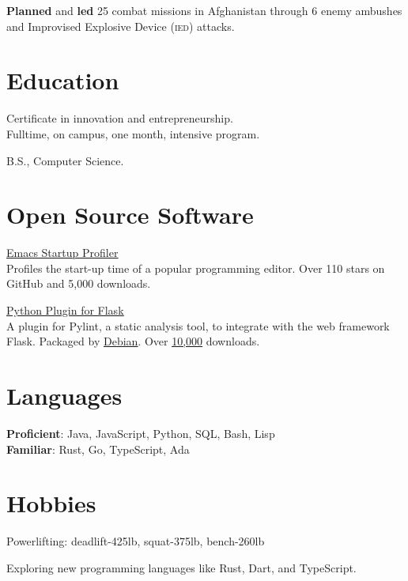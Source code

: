 \documentclass[letterpaper,11pt]{jschaf-resume}
\newcommand*{\action}[1]{\textbf{#1}}
\newcommand*{\abbrevparen}[1]{{\footnotesize (}\textsc{#1}{\footnotesize )}}
\begin{document}
\begin{paracol}{2}
\begin{workitems}
\item \action{Planned} and \action{led} 25 combat missions in Afghanistan
  through 6 enemy ambushes and Improvised Explosive Device \abbrevparen{ied} attacks.
\end{workitems}

\section*{Education}

Certificate in innovation and entrepreneurship.\\
Fulltime, on campus, one month, intensive program.

B.S., Computer Science.

\switchcolumn

\section*{Open Source Software}

\href{https://github.com/jschaf/esup}{\ul{Emacs Startup Profiler}}\\
Profiles the start-up time of a popular programming editor.  Over 110 stars on
GitHub and 5,000 downloads.

\href{https://github.com/jschaf/pylint-flask}{\ul{Python Plugin for Flask}}\\
A plugin for Pylint, a static analysis tool, to integrate with the web framework
Flask.  Packaged by
\href{https://packages.debian.org/sid/main/python3-pylint-flask}{\ul{Debian}}.  Over
\href{http://pypi-ranking.info/module/pylint-flask}{\ul{10,000}} downloads.


\section*{Languages}
\textbf{Proficient}: Java, JavaScript, Python, SQL, Bash, Lisp\\[6pt]
\textbf{Familiar}: Rust, Go, TypeScript, Ada

\section*{Hobbies}
Powerlifting: deadlift-425lb, squat-375lb, bench-260lb

Exploring new programming languages like Rust, Dart, and TypeScript.

\end{paracol}

\end{document}

